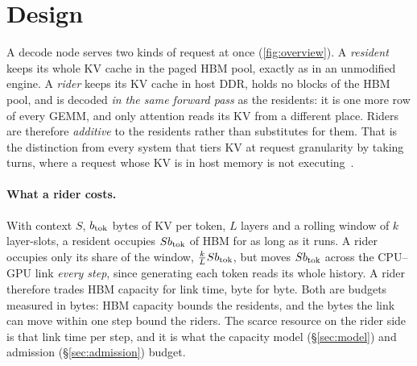 
\section{Design}\label{sec:design}



A decode node serves two kinds of request at once (\cref{fig:overview}). A
\emph{resident} keeps its whole KV cache in the paged HBM pool, exactly as in an
unmodified engine. A \emph{rider} keeps its KV cache in host DDR, holds no blocks
of the HBM pool, and is decoded \emph{in the same forward pass} as the residents:
it is one more row of every GEMM, and only attention reads its KV from a
different place. Riders are therefore \emph{additive} to the residents rather
than substitutes for them. That is the distinction from every system that tiers
KV at request granularity by taking turns, where a request whose KV is in host
memory is not executing~\cite{vllm,sglang}.

\paragraph{What a rider costs.} With context $S$, $b_{\mathrm{tok}}$ bytes of KV per token,
$L$ layers and a rolling window of $k$ layer-slots, a resident occupies $Sb_{\mathrm{tok}}$
of HBM for as long as it runs. A rider occupies only its share of the window,
$\tfrac{k}{L}Sb_{\mathrm{tok}}$, but moves $Sb_{\mathrm{tok}}$ across the CPU--GPU link \emph{every
step}, since generating each token reads its whole history. A rider therefore
trades HBM capacity for link time, byte for byte. Both are budgets measured in
bytes: HBM capacity bounds the residents, and the bytes the link can move within
one step bound the riders. The scarce resource on the rider side is that link
time per step, and it is what the capacity model (\S\ref{sec:model}) and
admission (\S\ref{sec:admission}) budget.

